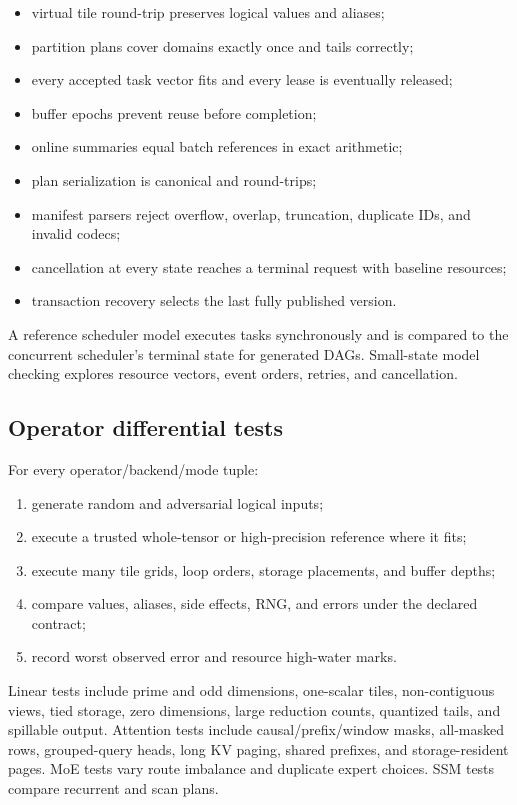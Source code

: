 \begin{itemize}
  \item virtual tile round-trip preserves logical values and aliases;
  \item partition plans cover domains exactly once and tails correctly;
  \item every accepted task vector fits and every lease is eventually released;
  \item buffer epochs prevent reuse before completion;
  \item online summaries equal batch references in exact arithmetic;
  \item plan serialization is canonical and round-trips;
  \item manifest parsers reject overflow, overlap, truncation, duplicate IDs, and invalid codecs;
  \item cancellation at every state reaches a terminal request with baseline resources;
  \item transaction recovery selects the last fully published version.
\end{itemize}

A reference scheduler model executes tasks synchronously and is compared to the concurrent scheduler's terminal state for generated DAGs. Small-state model checking explores resource vectors, event orders, retries, and cancellation.

\subsection{Operator differential tests}

For every operator/backend/mode tuple:

\begin{enumerate}
  \item generate random and adversarial logical inputs;
  \item execute a trusted whole-tensor or high-precision reference where it fits;
  \item execute many \AMS tile grids, loop orders, storage placements, and buffer depths;
  \item compare values, aliases, side effects, RNG, and errors under the declared contract;
  \item record worst observed error and resource high-water marks.
\end{enumerate}

Linear tests include prime and odd dimensions, one-scalar tiles, non-contiguous views, tied storage, zero dimensions, large reduction counts, quantized tails, and spillable output. Attention tests include causal/prefix/window masks, all-masked rows, grouped-query heads, long KV paging, shared prefixes, and storage-resident pages. MoE tests vary route imbalance and duplicate expert choices. SSM tests compare recurrent and scan plans.

